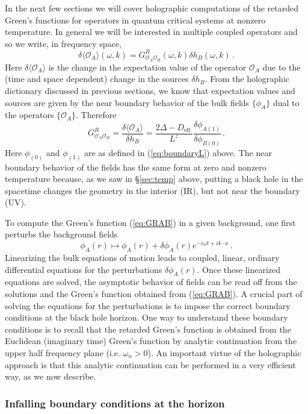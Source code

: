 \documentclass[10pt, oneside]{book}
\def\be{\begin{equation}}
\def\ee{\end{equation}}
\def\ocal{{\mathcal{O}}}
\begin{document}
\begin{doublespace}
In the next few sections we will cover holographic computations of the retarded Green's functions
for operators in quantum critical systems at nonzero temperature. In general we will be interested in multiple
coupled operators and so we write, in frequency space,
\be\label{eq:ho}
\delta \langle \ocal_A \rangle(\omega,k) = G^R_{\ocal_A \ocal_B}(\omega,k) \delta h_B(\omega,k) \,.
\ee
Here $\delta \langle \ocal_A \rangle$ is the change in the expectation value of the operator $\ocal_A$ due
to the (time and space dependent) change in the sources $\delta h_B$. From the holographic dictionary discussed in
previous sections, we know that expectation values and sources are given by the near boundary behavior
of the bulk fields $\{\phi_A\}$ dual to the operators $\{\ocal_A\}$. Therefore
\be\label{eq:GRAB}
G^R_{\ocal_A \ocal_B} = \frac{\delta \langle \ocal_A \rangle}{\delta h_B}
= \frac{2 \Delta - D_\text{eff.}}{L^z} \frac{\delta \phi_{A(1)}}{\delta \phi_{B (0)}} \,.
\ee
Here $\phi_{(0)}$ and $\phi_{(1)}$ are as defined in (\ref{eq:boundaryL}) above. The near boundary behavior
of the fields has the same form at zero and nonzero temperature because, as we saw in \S\ref{sec:temp} above,
putting a black hole in the spacetime changes the geometry in the interior (IR), but not near the boundary (UV).

To compute the Green's function (\ref{eq:GRAB}) in a given background, one first perturbs the background fields
\be
\phi_A(r) \mapsto \phi_A(r) + \delta \phi_A(r) e^{- i \omega t + i k \cdot x} \,.
\ee
Linearizing the bulk equations of motion leads to coupled, linear, ordinary differential equations for the perturbations $\delta\phi_A(r)$. Once these linearized equations are solved, the asymptotic behavior of fields can be read off from the solutions and the Green's function obtained from (\ref{eq:GRAB}). A crucial part of solving the equations for the perturbations is to impose the correct boundary conditions at the black hole horizon. One way to understand these boundary conditions is to recall that the retarded Green's function is obtained from the Euclidean (imaginary time) Green's function by analytic continuation from the upper half frequency plane (i.e. $\omega_n >0$). An important virtue of the holographic approach is that this analytic continuation can be performed in a very efficient way, as we now describe.

\subsubsection{Infalling boundary conditions at the horizon}
\label{sec:infal}


\end{doublespace}
\end{document}

